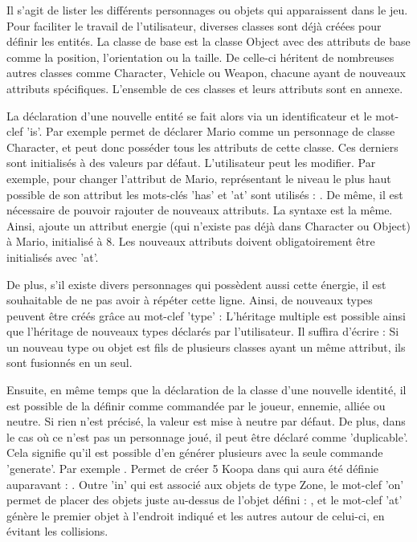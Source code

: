 Il s'agit de lister les différents personnages ou objets qui apparaissent dans le jeu.
Pour faciliter le travail de l'utilisateur, diverses classes sont déjà créées pour définir les entités.
La classe de base est la classe Object avec des attributs de base comme la position, l'orientation ou la taille.
De celle-ci héritent de nombreuses autres classes comme Character, Vehicle ou Weapon, chacune ayant de nouveaux attributs spécifiques.
L'ensemble de ces classes et leurs attributs sont en annexe.

La déclaration d'une nouvelle entité se fait alors via un identificateur et le mot-clef 'is'.
Par exemple  permet de déclarer Mario comme un personnage de classe Character, 
et peut donc posséder tous les attributs de cette classe. Ces derniers sont initialisés à des valeurs par défaut.
L'utilisateur peut les modifier. Par exemple, pour changer l'attribut  de Mario, 
représentant le niveau le plus haut possible de son attribut  les mots-clés 'has' et 'at' sont utilisés : 
.
De même, il est nécessaire de pouvoir rajouter de nouveaux attributs.
La syntaxe est la même. Ainsi,  ajoute un attribut energie (qui n'existe pas déjà dans Character ou Object) à Mario,
 initialisé à 8.
Les nouveaux attributs doivent obligatoirement être initialisés avec 'at'.

De plus, s'il existe divers personnages qui possèdent aussi cette énergie, il est souhaitable de ne pas avoir à répéter cette ligne.
Ainsi, de nouveaux types peuvent être créés grâce au mot-clef 'type' :
L'héritage multiple est possible ainsi que l'héritage de nouveaux types déclarés par l'utilisateur. Il suffira d'écrire :
 
Si un nouveau type ou objet est fils de plusieurs classes ayant un même attribut, ils sont fusionnés en un seul.

Ensuite, en même temps que la déclaration de la classe d'une nouvelle identité, il est possible de la définir comme commandée par le joueur, ennemie, alliée ou neutre.
Si rien n'est précisé, la valeur est mise à neutre par défaut.
 
De plus, dans le cas où ce n'est pas un personnage joué, il peut être déclaré comme 'duplicable'.
Cela signifie qu'il est possible d'en générer plusieurs avec la seule commande 'generate'.
Par exemple  . 
Permet de créer 5 Koopa dans  qui aura été définie auparavant : . 
Outre 'in' qui est associé aux objets de type Zone, le mot-clef 'on' permet de placer 
des objets juste au-dessus de l'objet défini : , et le mot-clef 'at' génère
le premier objet à l'endroit indiqué et les autres autour de celui-ci, en évitant les collisions.

